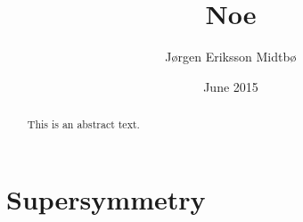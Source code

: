 \documentclass[twoside,english]{uiofysmaster}
\author{J\o rgen Eriksson Midtb\o}
\title{Noe}
\date{June 2015}
\begin{document}

\cleardoublepage

\begin{abstract}
This is an abstract text.
\end{abstract}



\tableofcontents
\listoffigures
\listoftables


\chapter{Supersymmetry}

\end{document}
